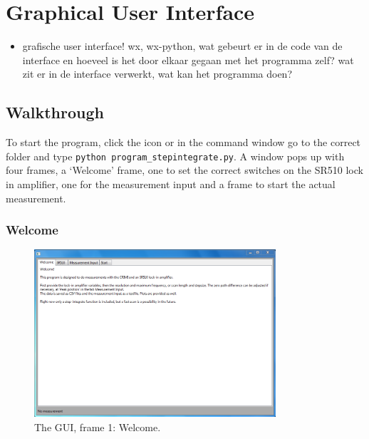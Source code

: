 
\section{Graphical User Interface}
\begin{itemize}
 \item grafische user interface! wx, wx-python, wat gebeurt er in de code van de interface en hoeveel is het door elkaar gegaan met het programma zelf? wat zit er in de interface verwerkt, wat kan het programma doen?
\end{itemize}

\subsection{Walkthrough}

To start the program, click the icon or in the command window go to the correct folder and type \verb!python program_stepintegrate.py!. A window pops up with four frames, a `Welcome' frame, one to set the correct switches on the SR510 lock in amplifier, one for the measurement input and a frame to start the actual measurement.

\subsubsection{Welcome}

\begin{figure}[!ht]
 \begin{center}
  \includegraphics[width=0.8\textwidth]{figures/gui1}
  \caption{The GUI, frame 1: Welcome.}
  \label{fig:gui1}
 \end{center}
\end{figure}

